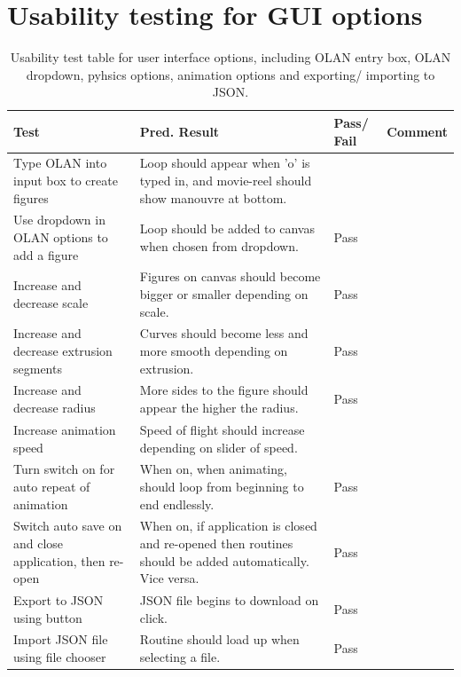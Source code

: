 \section{Usability testing for GUI options}
\label{test:options}
\begin{table}[h]
\begin{tabular}{|p{4.5cm}|p{4.5cm}|p{2cm}|p{2.5cm}|}
\hline
\textbf{Test} & \textbf{Pred. Result} & \textbf{Pass/ Fail} & \textbf{Comment}                        \\ \hline
Type OLAN into input box to create figures    &  Loop should appear when 'o' is typed in, and movie-reel should show manouvre at bottom.  &            &     \\ \hline
Use dropdown in OLAN options to add a figure    &  Loop should be added to canvas when chosen from dropdown.  &     Pass       &     \\ \hline
Increase and decrease scale    &  Figures on canvas should become bigger or smaller depending on scale.  &       Pass     &     \\ \hline
Increase and decrease extrusion segments    &  Curves should become less and more smooth depending on extrusion.  &       Pass     &     \\ \hline
Increase and decrease radius    &  More sides to the figure should appear the higher the radius.  &     Pass       &     \\ \hline
Increase animation speed    &   Speed of flight should increase depending on slider of speed. &            &     \\ \hline
Turn switch on for auto repeat of animation    &  When on, when animating, should loop from beginning to end endlessly.  &       Pass     &     \\ \hline
Switch auto save on and close application, then re-open    &  When on, if application is closed and re-opened then routines should be added automatically. Vice versa.  &       Pass     &     \\ \hline
Export to JSON using button    &  JSON file begins to download on click.  &      Pass      &     \\ \hline
Import JSON file using file chooser  &  Routine should load up when selecting a file.  &      Pass      &     \\ \hline
\end{tabular}
\caption{Usability test table for user interface options, including OLAN entry box, OLAN dropdown, pyhsics options, animation options and exporting/ importing to JSON.}
\end{table}

